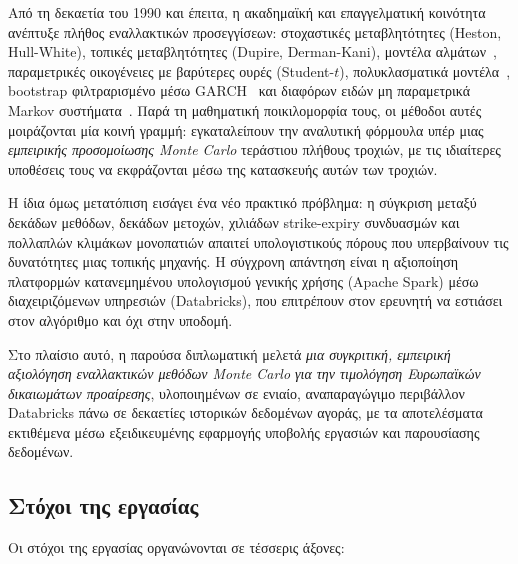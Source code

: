 \documentclass[12pt]{article}
\begin{document}
Από τη δεκαετία του 1990 και έπειτα, η ακαδημαϊκή και επαγγελματική κοινότητα ανέπτυξε πλήθος εναλλακτικών προσεγγίσεων: στοχαστικές μεταβλητότητες (Heston, Hull-White), τοπικές μεταβλητότητες (Dupire, Derman-Kani), μοντέλα αλμάτων~\cite{Merton1976}, παραμετρικές οικογένειες με βαρύτερες ουρές (Student-$t$), πολυκλασματικά μοντέλα~\cite{MandelbrotFC1997}, bootstrap φιλτραρισμένο μέσω GARCH~\cite{BaroneAdesi2008} και διαφόρων ειδών μη παραμετρικά Markov συστήματα~\cite{PolitisRomano1994, PaparoditisPolitis2002}. Παρά τη μαθηματική ποικιλομορφία τους, οι μέθοδοι αυτές μοιράζονται μία κοινή γραμμή: εγκαταλείπουν την αναλυτική φόρμουλα υπέρ μιας \emph{εμπειρικής προσομοίωσης Monte Carlo} τεράστιου πλήθους τροχιών, με τις ιδιαίτερες υποθέσεις τους να εκφράζονται μέσω της κατασκευής αυτών των τροχιών.

Η ίδια όμως μετατόπιση εισάγει ένα νέο πρακτικό πρόβλημα: η σύγκριση μεταξύ δεκάδων μεθόδων, δεκάδων μετοχών, χιλιάδων strike-expiry συνδυασμών και πολλαπλών κλιμάκων μονοπατιών απαιτεί υπολογιστικούς πόρους που υπερβαίνουν τις δυνατότητες μιας τοπικής μηχανής. Η σύγχρονη απάντηση είναι η αξιοποίηση πλατφορμών κατανεμημένου υπολογισμού γενικής χρήσης (Apache Spark) μέσω διαχειριζόμενων υπηρεσιών (Databricks), που επιτρέπουν στον ερευνητή να εστιάσει στον αλγόριθμο και όχι στην υποδομή.

Στο πλαίσιο αυτό, η παρούσα διπλωματική μελετά \emph{μια συγκριτική, εμπειρική αξιολόγηση εναλλακτικών μεθόδων Monte Carlo για την τιμολόγηση Ευρωπαϊκών δικαιωμάτων προαίρεσης}, υλοποιημένων σε ενιαίο, αναπαραγώγιμο περιβάλλον Databricks πάνω σε δεκαετίες ιστορικών δεδομένων αγοράς, με τα αποτελέσματα εκτιθέμενα μέσω εξειδικευμένης εφαρμογής υποβολής εργασιών και παρουσίασης δεδομένων.

\subsection{Στόχοι της εργασίας}
Οι στόχοι της εργασίας οργανώνονται σε τέσσερις άξονες:
\end{document}

